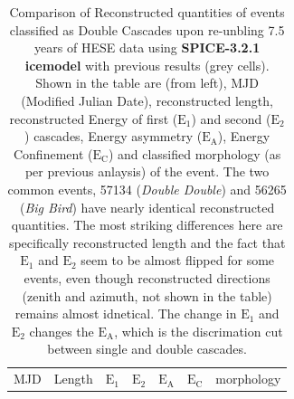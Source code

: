 \begin{table}[h!]
    \caption{Comparison of Reconstructed quantities of events classified as Double Cascades upon re-unbling 7.5 years of HESE data using \textbf{SPICE-3.2.1 icemodel} with previous results (grey cells). Shown in the table are (from left), MJD (Modified Julian Date), reconstructed length, reconstructed Energy of first ($\mathrm{E}_1$) and second ($\mathrm{E}_2$) cascades, Energy asymmetry ($\mathrm{E}_\mathrm{A}$), Energy Confinement ($\mathrm{E}_\mathrm{C}$) and classified morphology (as per previous anlaysis) of the event. The two common events, 57134 (\emph{Double Double}) and 56265 (\emph{Big Bird}) have nearly identical reconstructed quantities. The most striking differences here are specifically reconstructed length and the fact that $\mathrm{E}_1$ and $\mathrm{E}_2$ seem to be almost flipped for some events, even though reconstructed directions (zenith and azimuth, not shown in the table) remains almost idnetical. The change in $\mathrm{E}_1$ and $\mathrm{E}_2$ changes the $\mathrm{E}_\mathrm{A}$, which is the discrimation cut between single and double cascades.}
    \begin{tabular}{c|cc|cc|cc|cc|cc|c}
        \toprule
         MJD    & \multicolumn{2}{c|}{Length}
                
                        & \multicolumn{2}{c|}{$\mathrm{E}_\mathrm{1}$}
                                & \multicolumn{2}{c|}{$\mathrm{E}_\mathrm{2}$} 
                                    & \multicolumn{2}{c|}{$\mathrm{E}_\mathrm{A}$} 
                                        & \multicolumn{2}{c|}{$\mathrm{E}_\mathrm{C}$}  
                                            & \multicolumn{1}{c}{morphology}                \\
                       

\end{tabular}
\end{table}
